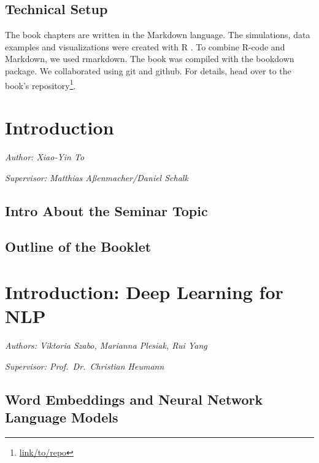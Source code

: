 \documentclass[]{krantz}
\renewcommand{\href}[2]{#2\footnote{\url{#1}}}
\begin{document}
\hypertarget{technical-setup}{%
\section*{Technical Setup}\label{technical-setup}}


The book chapters are written in the Markdown language.
The simulations, data examples and visualizations were created with R \citep{rlang}.
To combine R-code and Markdown, we used rmarkdown.
The book was compiled with the bookdown package.
We collaborated using git and github.
For details, head over to the \href{link/to/repo}{book's repository}.

\hypertarget{introduction}{%
\chapter{Introduction}\label{introduction}}

\emph{Author: Xiao-Yin To}

\emph{Supervisor: Matthias Aßenmacher/Daniel Schalk}

\hypertarget{intro-about-the-seminar-topic}{%
\section{Intro About the Seminar Topic}\label{intro-about-the-seminar-topic}}

\hypertarget{outline-of-the-booklet}{%
\section{Outline of the Booklet}\label{outline-of-the-booklet}}

\hypertarget{introduction-deep-learning-for-nlp}{%
\chapter{Introduction: Deep Learning for NLP}\label{introduction-deep-learning-for-nlp}}

\emph{Authors: Viktoria Szabo, Marianna Plesiak, Rui Yang}

\emph{Supervisor: Prof.~Dr.~Christian Heumann}

\hypertarget{word-embeddings-and-neural-network-language-models}{%
\section{Word Embeddings and Neural Network Language Models}\label{word-embeddings-and-neural-network-language-models}}
\end{document}
